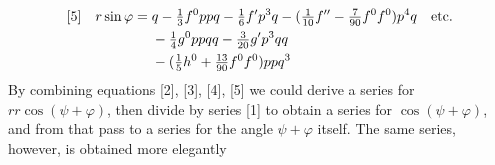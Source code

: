 \[
\begin{aligned}
\relax[5]\quad r\sin\varphi={}&q-\tfrac{1}{3}f^0ppq-\tfrac{1}{6}f'p^3q-(\tfrac{1}{10}f''-\tfrac{7}{90}f^0f^0)p^4q\quad\text{etc.}\\
&-\tfrac{1}{4}g^0ppqq-\tfrac{3}{20}g'p^3qq\\
&-(\tfrac{1}{5}h^0+\tfrac{13}{90}f^0f^0)ppq^3
\end{aligned}
\]
By combining equations [2], [3], [4], [5] we could derive a series for \(rr\cos(\psi+\varphi)\), then divide by series [1] to obtain a series for \(\cos(\psi+\varphi)\), and from that pass to a series for the angle \(\psi+\varphi\) itself. The same series, however, is obtained more elegantly
